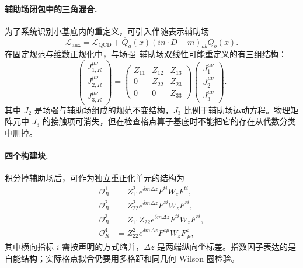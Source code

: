 \paragraph{辅助场闭包中的三角混合.}
为了系统识别小基底内的重定义，可引入伴随表示辅助场
\begin{equation}
  \mathcal L_{\mathrm{aux}}
  =\mathcal L_{\mathrm{QCD}}
  +\overline Q_a(x)(in\cdot D-m)_{ab}Q_b(x).
  \label{eq:b05-auxiliary-lagrangian}
\end{equation}
在固定规范与维数正规化中，与场强--辅助场双线性可能重定义的有三组结构：
\begin{equation}
  \begin{pmatrix}J_{1,R}^{\mu\nu}\\J_{2,R}^{\mu\nu}\\J_{3,R}^{\mu\nu}\end{pmatrix}
  =
  \begin{pmatrix}
    Z_{11}&Z_{12}&Z_{13}\\
    0&Z_{22}&Z_{23}\\
    0&0&Z_{33}
  \end{pmatrix}
  \begin{pmatrix}J_1^{\mu\nu}\\J_2^{\mu\nu}\\J_3^{\mu\nu}\end{pmatrix}.
  \label{eq:b05-triangular-mixing}
\end{equation}
其中 \(J_2\) 是场强与辅助场组成的规范不变结构，\(J_3\) 比例于辅助场运动方程。物理矩阵元中 \(J_3\) 的接触项可消失，但在检查格点算子基底时不能把它的存在从代数分类中删掉。

\paragraph{四个构建块.}
积分掉辅助场后，可作为独立重正化单元的结构为
\begin{align}
  \mathcal O_R^1
  &=Z_{11}^2e^{\delta m\Delta z}
    F^{ti}W_{z}F^{ti},\label{eq:b05-block1}\\
  \mathcal O_R^2
  &=Z_{22}^2e^{\delta m\Delta z}
    F^{zi}W_{z}F^{zi},\label{eq:b05-block2}\\
  \mathcal O_R^3
  &=Z_{11}Z_{22}e^{\delta m\Delta z}
    F^{ti}W_{z}F^{zi},\label{eq:b05-block3}\\
  \mathcal O_R^4
  &=Z_{22}^2e^{\delta m\Delta z}
    F^{z\mu}W_{z}F^{z}_{\ \mu},
  \label{eq:b05-block4}
\end{align}
其中横向指标 \(i\) 需按声明的方式缩并，\(\Delta z\) 是两端纵向坐标差。指数因子表达的是自能结构；实际格点拟合仍要用多格距和同几何 Wilson 圈检验。

